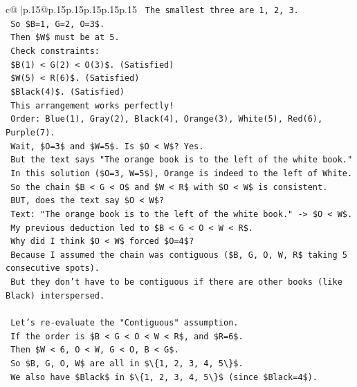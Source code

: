 \documentclass{article}
\begin{document}
{\begin{supertabular}{c@{$\;$}|p{.15\linewidth}@{}p{.15\linewidth}p{.15\linewidth}p{.15\linewidth}p{.15\linewidth}p{.15\linewidth}}
{{{\texttt{    The smallest three are 1, 2, 3.} \\
\texttt{    So \$B=1, G=2, O=3\$.} \\
\texttt{    Then \$W\$ must be at 5.} \\
\texttt{    Check constraints:} \\
\texttt{    \$B(1) < G(2) < O(3)\$. (Satisfied)} \\
\texttt{    \$W(5) < R(6)\$. (Satisfied)} \\
\texttt{    \$Black(4)\$. (Satisfied)} \\
\texttt{    This arrangement works perfectly!} \\
\texttt{    Order: Blue(1), Gray(2), Black(4), Orange(3), White(5), Red(6), Purple(7).} \\
\texttt{    Wait, \$O=3\$ and \$W=5\$. Is \$O < W\$? Yes.} \\
\texttt{    But the text says "The orange book is to the left of the white book."} \\
\texttt{    In this solution (\$O=3, W=5\$), Orange is indeed to the left of White.} \\
\texttt{    So the chain \$B < G < O\$ and \$W < R\$ with \$O < W\$ is consistent.} \\
\texttt{    BUT, does the text say \$O < W\$?} \\
\texttt{    Text: "The orange book is to the left of the white book." {-}> \$O < W\$.} \\
\texttt{    My previous deduction led to \$B < G < O < W < R\$.} \\
\texttt{    Why did I think \$O < W\$ forced \$O=4\$?} \\
\texttt{    Because I assumed the chain was contiguous (\$B, G, O, W, R\$ taking 5 consecutive spots).} \\
\texttt{    But they don't have to be contiguous if there are other books (like Black) interspersed.} \\
\\ 
\texttt{    Let's re{-}evaluate the "Contiguous" assumption.} \\
\texttt{    If the order is \$B < G < O < W < R\$, and \$R=6\$.} \\
\texttt{    Then \$W < 6, O < W, G < O, B < G\$.} \\
\texttt{    So \$B, G, O, W\$ are all in \$\textbackslash{}\{1, 2, 3, 4, 5\textbackslash{}\}\$.} \\
\texttt{    We also have \$Black\$ in \$\textbackslash{}\{1, 2, 3, 4, 5\textbackslash{}\}\$ (since \$Black=4\$).} \\
}}}
\end{supertabular}}
\end{document}
